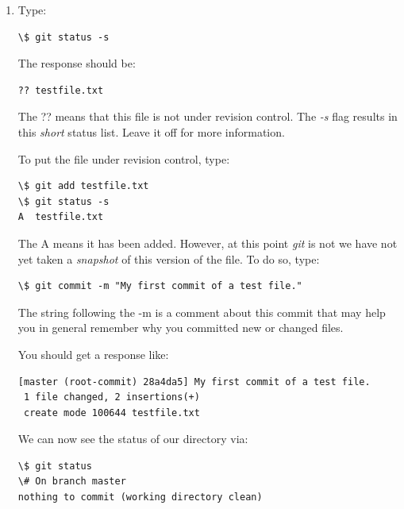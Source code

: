 \documentclass[letterpaper,10pt,english]{sphinxmanual}
\begin{document}
\begin{enumerate}
\item {} 
Type:

\begin{Verbatim}[commandchars=\\\{\}]
\$ git status -s
\end{Verbatim}

The response should be:

\begin{Verbatim}[commandchars=\\\{\}]
?? testfile.txt
\end{Verbatim}

The ?? means that this file is not under revision control.
The \emph{-s} flag results in this \emph{short} status list.  Leave it off for more
information.

To put the file under revision control, type:

\begin{Verbatim}[commandchars=\\\{\}]
\$ git add testfile.txt
\$ git status -s
A  testfile.txt
\end{Verbatim}

The A means it has been added.  However, at this point \emph{git} is not
we have not yet taken a \emph{snapshot} of this version of the file.
To do so, type:

\begin{Verbatim}[commandchars=\\\{\}]
\$ git commit -m "My first commit of a test file."
\end{Verbatim}

The string following the -m is a comment about this commit that may help
you in general remember why you committed new or changed files.

You should get a response like:

\begin{Verbatim}[commandchars=\\\{\}]
[master (root-commit) 28a4da5] My first commit of a test file.
 1 file changed, 2 insertions(+)
 create mode 100644 testfile.txt
\end{Verbatim}

We can now see the status of our directory via:

\begin{Verbatim}[commandchars=\\\{\}]
\$ git status
\# On branch master
nothing to commit (working directory clean)
\end{Verbatim}


\end{enumerate}
\end{document}

